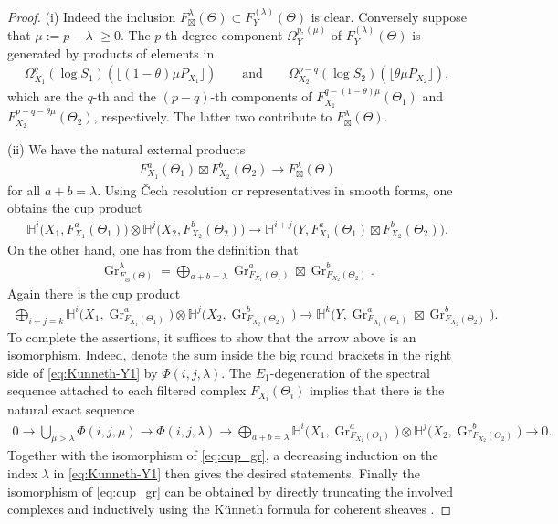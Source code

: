 \documentclass[pdftex]{sigma}
\newcommand{\HH}{\mathbb{H}}
\newcommand{\ddRH}{\Theta}
\newcommand{\flr}[1]{\lfloor #1 \rfloor}
\newcommand{\Gr}{\operatorname{Gr}}
\begin{document}
\begin{proof}(i) Indeed the inclusion $F_\boxtimes^\lambda(\ddRH) \subset F_Y^{(\lambda)}(\ddRH)$ is clear. Conversely suppose that $\mu := p-\lambda$ $\geq 0$. The $p$-th degree component $\Omega_Y^{p,(\mu)}$ of $F_Y^{(\lambda)}(\ddRH)$ is generated by products of elements in
\begin{gather*} \Omega_{X_1}^q(\log S_1)(\flr{(1-\theta)\mu P_{X_1}})\qquad\text{and}\qquad \Omega_{X_2}^{p-q}(\log S_2)(\flr{\theta\mu P_{X_2}}), \end{gather*}
which are the $q$-th and the $(p-q)$-th components of $F_{X_1}^{q-(1-\theta)\mu}(\ddRH_1)$ and $F_{X_2}^{p-q-\theta\mu}(\ddRH_2)$, respectively. The latter two contribute to $F_\boxtimes^\lambda(\ddRH)$.

(ii) We have the natural external products
\begin{gather*} F_{X_1}^a(\ddRH_1)\boxtimes F_{X_2}^b(\ddRH_2)	\to F_\boxtimes^\lambda(\ddRH) \end{gather*}
for all $a+b = \lambda$. Using \v{C}ech resolution or representatives in smooth forms, one obtains the cup product
\begin{gather*} \HH^i\big(X_1,F_{X_1}^a(\ddRH_1)\big)\otimes	\HH^j\big(X_2,F^b_{X_2}(\ddRH_2)\big)\to \HH^{i+j}\big(Y,	F_{X_1}^a(\ddRH_1)\boxtimes F_{X_2}^b(\ddRH_2)\big). \end{gather*}
On the other hand, one has from the definition that
\begin{gather*} \Gr_{F_\boxtimes(\ddRH)}^\lambda = \bigoplus_{a+b=\lambda} \Gr_{F_{X_1}(\ddRH_1)}^a \boxtimes \Gr_{F_{X_2}(\ddRH_2)}^b. \end{gather*}
Again there is the cup product
\begin{gather}\label{eq:cup_gr}
\bigoplus_{i+j=k} \HH^i\big(X_1,\Gr_{F_{X_1}(\ddRH_1)}^a\big)\otimes \HH^j\big(X_2,\Gr_{F_{X_2}(\ddRH_2)}^b\big)\to \HH^k\big(Y, \Gr_{F_{X_1}(\ddRH_1)}^a \boxtimes \Gr_{F_{X_2}(\ddRH_2)}^b \big).
\end{gather}
To complete the assertions, it suffices to show that the arrow above is an isomorphism. Indeed, denote the sum inside the big round brackets in the right side of \eqref{eq:Kunneth-Y1} by $\Phi(i,j,\lambda)$. The $E_1$-degeneration of the spectral sequence attached to each filtered complex $F_{X_i}(\ddRH_i)$ implies that there is the natural exact sequence
\begin{gather*} 0 \to \bigcup_{\mu>\lambda} \Phi(i,j,\mu) \to \Phi(i,j,\lambda) \to\bigoplus_{a+b=\lambda} \HH^i\big(X_1,\Gr_{F_{X_1}(\ddRH_1)}^a\big) \otimes \HH^j\big(X_2,\Gr_{F_{X_2}(\ddRH_2)}^b\big) \to 0. \end{gather*}
Together with the isomorphism of \eqref{eq:cup_gr}, a decreasing induction on the index $\lambda$ in \eqref{eq:Kunneth-Y1} then gives the desired statements. Finally the isomorphism of \eqref{eq:cup_gr} can be obtained by directly truncating the involved complexes and inductively using the K\"unneth formula for coherent sheaves \cite[Theorem~1]{SW}.
\end{proof}
\end{document}
